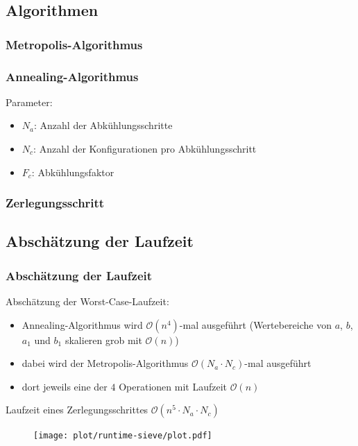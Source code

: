 \subsection*{Algorithmen}
\begin{frame}
  \frametitle{Metropolis-Algorithmus}
  
\end{frame}

\begin{frame}
  \frametitle{Annealing-Algorithmus}
  Parameter:
  \begin{itemize}
    \item $N_a$: Anzahl der Abkühlungsschritte
    \item $N_c$: Anzahl der Konfigurationen pro Abkühlungsschritt
    \item $F_c$: Abkühlungsfaktor
  \end{itemize}
  \vspace{0.5cm}
  
\end{frame}

\begin{frame}
  \frametitle{Zerlegungsschritt}
  
\end{frame}

\subsection*{Abschätzung der Laufzeit}
\begin{frame}[allowframebreaks]
  \frametitle{Abschätzung der Laufzeit}
  Abschätzung der Worst-Case-Laufzeit:
  \begin{itemize}
    \item Annealing-Algorithmus wird $\mathcal{O}\left(n^4\right)$-mal ausgeführt (Wertebereiche von $a$, $b$, $a_1$ und $b_1$ skalieren grob mit $\mathcal{O}\left(n\right)$)
    \item dabei wird der Metropolis-Algorithmus $\mathcal{O}\left(N_a\cdot N_c\right)$-mal ausgeführt
    \item dort jeweils eine der $4$ Operationen mit Laufzeit $\mathcal{O}\left(n\right)$
  \end{itemize}
  \Rightarrow{} Laufzeit eines Zerlegungsschrittes $\mathcal{O}\left(n^5\cdot N_a\cdot N_c\right)$
  \pause{}
  \begin{figure}[H]
    \centering
    \texttt{[image: plot/runtime-sieve/plot.pdf]}
  \end{figure}
\end{frame}
